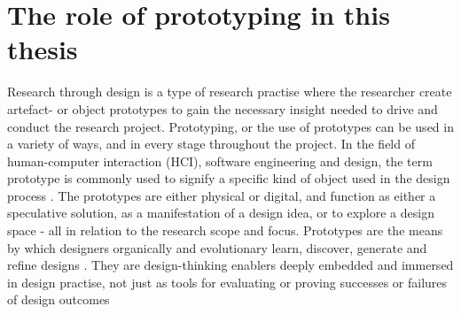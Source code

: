\section{The role of prototyping in this thesis}
Research through design is a type of research practise where the researcher create artefact- or object prototypes to gain the necessary insight needed to drive and conduct the research project. Prototyping, or the use of prototypes can be used in a variety of ways, and in every stage throughout the project. In the field of human-computer interaction (HCI), software engineering and design, the term prototype is commonly used to signify a specific kind of object used in the design process \autocite[p. 2]{lim_anatomy_2008}. The prototypes are either physical or digital, and function as either a speculative solution, as a manifestation of a design idea, or to explore a design space - all in relation to the research scope and focus. Prototypes are the means by which designers organically and evolutionary learn, discover, generate and refine designs \autocite[p. 2]{lim_anatomy_2008}. They are design-thinking enablers deeply embedded and immersed in design practise, not just as tools for evaluating or proving successes or failures of design outcomes \autocite[p. 2]{lim_anatomy_2008}


